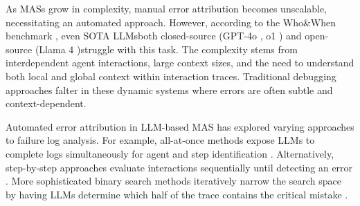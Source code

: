 \documentclass{article}
\begin{document}

As MASs grow in complexity, manual error attribution becomes unscalable, necessitating an automated approach. However, according to the Who\&When benchmark \cite{zhang2025agent}, even SOTA LLMs\textemdash both closed-source (GPT-4o \cite{hurst2024gpt}, o1 \cite{jaech2024openai}) and open-source (Llama 4 \cite{meta2025llama})\textemdash struggle with this task. The complexity stems from interdependent agent interactions, large context sizes, and the need to understand both local and global context within interaction traces. Traditional debugging approaches falter in these dynamic systems where errors are often subtle and context-dependent.



Automated error attribution in LLM-based MAS has explored varying approaches to failure log analysis. For example, all-at-once methods expose LLMs to complete logs simultaneously for agent and step identification \cite{zhang2025agent}. Alternatively, step-by-step approaches evaluate interactions sequentially until detecting an error \cite{zhang2025agent}. More sophisticated binary search methods iteratively narrow the search space by having LLMs determine which half of the trace contains the critical mistake \cite{zhang2025agent}.
\end{document}
